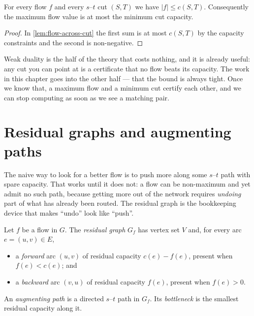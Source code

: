 \begin{corollary}\label{cor:flow-weak-duality}
For every flow $f$ and every $s$--$t$ cut $(S,T)$ we have $|f| \le c(S,T)$.
Consequently the maximum flow value is at most the minimum cut capacity.
\end{corollary}

\begin{proof}
In \cref{lem:flow-across-cut} the first sum is at most $c(S,T)$ by the capacity
constraints and the second is non-negative.
\end{proof}

\begin{intuition}
Weak duality is the half of the theory that costs nothing, and it is already
useful: any cut you can point at is a certificate that no flow beats its
capacity. The work in this chapter goes into the other half --- that the bound
is always tight. Once we know that, a maximum flow and a minimum cut certify
each other, and we can stop computing as soon as we see a matching pair.
\end{intuition}

\section{Residual graphs and augmenting paths}
\label{sec:flow-residual}

The naive way to look for a better flow is to push more along some $s$--$t$
path with spare capacity. That works until it does not: a flow can be
non-maximum and yet admit no such path, because getting more out of the network
requires \emph{undoing} part of what has already been routed. The residual
graph is the bookkeeping device that makes ``undo'' look like ``push''.

\begin{definition}\label{def:flow-residual}
Let $f$ be a flow in $G$. The \emph{residual graph} $G_f$ has vertex set $V$
and, for every arc $e = (u,v) \in E$,
\begin{itemize}[nosep]
  \item a \emph{forward} arc $(u,v)$ of residual capacity $c(e) - f(e)$,
        present when $f(e) < c(e)$; and
  \item a \emph{backward} arc $(v,u)$ of residual capacity $f(e)$, present
        when $f(e) > 0$.
\end{itemize}
An \emph{augmenting path} is a directed $s$--$t$ path in $G_f$. Its
\emph{bottleneck} is the smallest residual capacity along it.
\end{definition}

